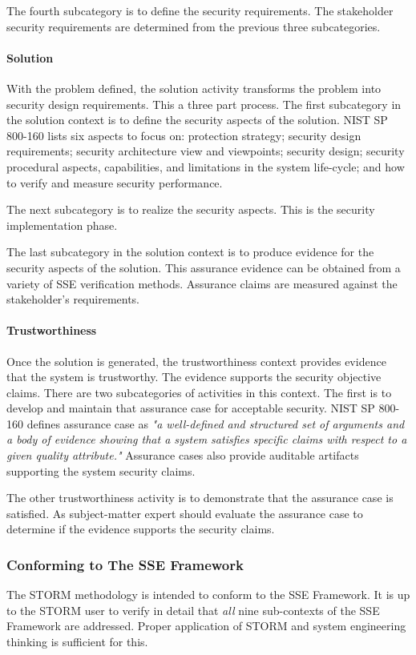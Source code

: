 \documentclass[../../main/main.tex]{subfiles}
\begin{document}
The fourth subcategory is to define the security requirements.  The stakeholder security requirements are determined from the previous three subcategories.

\paragraph*{Solution}
With the problem defined, the solution activity transforms the problem into security design requirements.  This a three part process.  The first subcategory in the solution context is to define the security aspects of the solution. NIST SP 800-160 lists six aspects to focus on: protection strategy; security design requirements; security architecture view and viewpoints; security design; security procedural aspects, capabilities, and limitations in the system life-cycle; and how to verify and measure security performance. 

The next subcategory is to realize the security aspects.  This is the security implementation phase.

The last subcategory in the solution context is to produce evidence for the security aspects of the solution. This assurance evidence can be obtained from a variety of SSE verification methods.  Assurance claims are measured against the stakeholder's requirements.

\paragraph*{Trustworthiness}
Once the solution is generated, the trustworthiness context provides evidence that the system is trustworthy.  The evidence supports the security objective claims.  There are two subcategories of activities in this context.  The first is to develop and maintain that assurance case for acceptable security.  NIST SP 800-160 defines assurance case as \textit{"a well-defined and structured set of arguments and a body of evidence showing that a system satisfies specific claims with respect to a given quality attribute."}  Assurance cases also provide auditable artifacts supporting the system security claims.

The other trustworthiness activity is to demonstrate that the assurance case is satisfied.  As subject-matter expert should evaluate the assurance case to determine if the evidence supports the security claims.

\subsubsection{Conforming to The SSE Framework}
The STORM methodology is intended to conform to the SSE Framework.  It is up to the STORM user to verify in detail that \textit{all} nine sub-contexts of the SSE Framework are addressed.  Proper application of STORM and system engineering thinking is sufficient for this.
\end{document}
